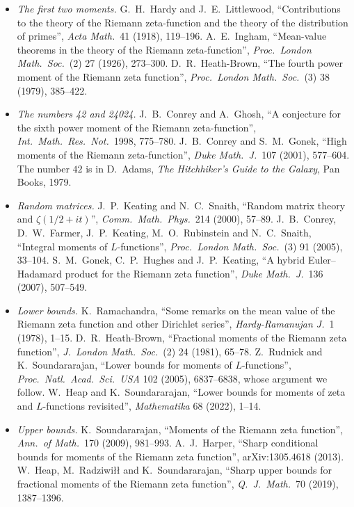 \begin{itemize}
\item \emph{The first two moments.} G.~H.~Hardy and J.~E.~Littlewood, ``Contributions to the theory of the Riemann zeta-function and the theory of the distribution of primes'', \emph{Acta Math.}\ 41 (1918), 119--196. A.~E.~Ingham, ``Mean-value theorems in the theory of the Riemann zeta-function'', \emph{Proc.\ London Math.\ Soc.}\ (2) 27 (1926), 273--300. D.~R.~Heath-Brown, ``The fourth power moment of the Riemann zeta function'', \emph{Proc.\ London Math.\ Soc.}\ (3) 38 (1979), 385--422.
\item \emph{The numbers 42 and 24024.} J.~B.~Conrey and A.~Ghosh, ``A conjecture for the sixth power moment of the Riemann zeta-function'', \emph{Int.\ Math.\ Res.\ Not.}\ 1998, 775--780. J.~B.~Conrey and S.~M.~Gonek, ``High moments of the Riemann zeta-function'', \emph{Duke Math.\ J.}\ 107 (2001), 577--604. The number $42$ is in D.~Adams, \emph{The Hitchhiker's Guide to the Galaxy}, Pan Books, 1979.
\item \emph{Random matrices.} J.~P.~Keating and N.~C.~Snaith, ``Random matrix theory and $\zeta(1/2+it)$'', \emph{Comm.\ Math.\ Phys.}\ 214 (2000), 57--89. J.~B.~Conrey, D.~W.~Farmer, J.~P.~Keating, M.~O.~Rubinstein and N.~C.~Snaith, ``Integral moments of $L$-functions'', \emph{Proc.\ London Math.\ Soc.}\ (3) 91 (2005), 33--104. S.~M.~Gonek, C.~P.~Hughes and J.~P.~Keating, ``A hybrid Euler--Hadamard product for the Riemann zeta function'', \emph{Duke Math.\ J.}\ 136 (2007), 507--549.
\item \emph{Lower bounds.} K.~Ramachandra, ``Some remarks on the mean value of the Riemann zeta function and other Dirichlet series'', \emph{Hardy-Ramanujan J.}\ 1 (1978), 1--15. D.~R.~Heath-Brown, ``Fractional moments of the Riemann zeta function'', \emph{J.\ London Math.\ Soc.}\ (2) 24 (1981), 65--78. Z.~Rudnick and K.~Soundararajan, ``Lower bounds for moments of $L$-functions'', \emph{Proc.\ Natl.\ Acad.\ Sci.\ USA} 102 (2005), 6837--6838, whose argument we follow. W.~Heap and K.~Soundararajan, ``Lower bounds for moments of zeta and $L$-functions revisited'', \emph{Mathematika} 68 (2022), 1--14.
\item \emph{Upper bounds.} K.~Soundararajan, ``Moments of the Riemann zeta function'', \emph{Ann.\ of Math.}\ 170 (2009), 981--993. A.~J.~Harper, ``Sharp conditional bounds for moments of the Riemann zeta function'', arXiv:1305.4618 (2013). W.~Heap, M.~Radziwi\l\l{} and K.~Soundararajan, ``Sharp upper bounds for fractional moments of the Riemann zeta function'', \emph{Q.\ J.\ Math.}\ 70 (2019), 1387--1396.
\end{itemize}
